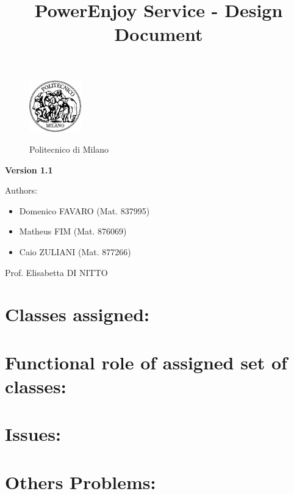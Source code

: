 \documentclass[a4paper]{article}
\title{PowerEnjoy Service - Design Document}
\begin{document}
\begin{titlepage}
\begin{figure}
\centering
\includegraphics[width=0.2\textwidth]{polimi.jpg}
\par
\LARGE Politecnico di Milano
\end{figure}


\maketitle
\textbf{Version 1.1}
\newline

\raggedright
Authors:
\begin{itemize}
	\item Domenico FAVARO (Mat. 837995)
        	\item Matheus FIM (Mat. 876069)
	\item Caio ZULIANI (Mat. 877266)	
\end{itemize}
\raggedleft
Prof. Elisabetta DI NITTO
\thispagestyle{empty}
\end{titlepage}

\tableofcontents
\newpage
 
\section{Classes assigned:}


\subsection{}

\section{Functional role of assigned set of classes:}

\section{Issues:}

\section{Others Problems:}
\end{document}
